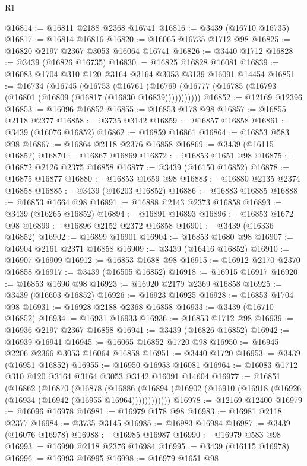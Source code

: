 \begin{lexlean}{R1}
\begin{coremodule}
@16814 := @16811 @2188 @2368 @16741
@16816 := @3439 (@16710 @16735)
@16817 := @16814 @16816
@16820 := @16065 @16735 @1712 @98
@16825 := @16820 @2197 @2367 @3053 @16064 @16741
@16826 := @3440 @1712
@16828 := @3439 (@16826 @16735)
@16830 := @16825 @16828 @16081
@16839 := @16083 @1704 @310 @120 @3164 @3164 @3053 @3139 @16091 @14454
@16851 := @16734
    (@16745
      (@16753
        (@16761 (@16769 (@16777 (@16785 (@16793 (@16801 (@16809 (@16817 (@16830 @16839)))))))))))
@16852 := @12169 @12396
@16853 := @16096 @16852
@16855 := @16853 @178 @98
@16857 := @16855 @2118 @2377
@16858 := @3735 @3142
@16859 := @16857 @16858
@16861 := @3439 (@16076 @16852)
@16862 := @16859 @16861
@16864 := @16853 @583 @98
@16867 := @16864 @2118 @2376 @16858
@16869 := @3439 (@16115 @16852)
@16870 := @16867 @16869
@16872 := @16853 @1651 @98
@16875 := @16872 @2126 @2375 @16858
@16877 := @3439 (@16150 @16852)
@16878 := @16875 @16877
@16880 := @16853 @1659 @98
@16883 := @16880 @2135 @2374 @16858
@16885 := @3439 (@16203 @16852)
@16886 := @16883 @16885
@16888 := @16853 @1664 @98
@16891 := @16888 @2143 @2373 @16858
@16893 := @3439 (@16265 @16852)
@16894 := @16891 @16893
@16896 := @16853 @1672 @98
@16899 := @16896 @2152 @2372 @16858
@16901 := @3439 (@16336 @16852)
@16902 := @16899 @16901
@16904 := @16853 @1680 @98
@16907 := @16904 @2161 @2371 @16858
@16909 := @3439 (@16416 @16852)
@16910 := @16907 @16909
@16912 := @16853 @1688 @98
@16915 := @16912 @2170 @2370 @16858
@16917 := @3439 (@16505 @16852)
@16918 := @16915 @16917
@16920 := @16853 @1696 @98
@16923 := @16920 @2179 @2369 @16858
@16925 := @3439 (@16603 @16852)
@16926 := @16923 @16925
@16928 := @16853 @1704 @98
@16931 := @16928 @2188 @2368 @16858
@16933 := @3439 (@16710 @16852)
@16934 := @16931 @16933
@16936 := @16853 @1712 @98
@16939 := @16936 @2197 @2367 @16858
@16941 := @3439 (@16826 @16852)
@16942 := @16939 @16941
@16945 := @16065 @16852 @1720 @98
@16950 := @16945 @2206 @2366 @3053 @16064 @16858
@16951 := @3440 @1720
@16953 := @3439 (@16951 @16852)
@16955 := @16950 @16953 @16081
@16964 := @16083 @1712 @310 @120 @3164 @3164 @3053 @3142 @16091 @14604
@16977 := @16851
    (@16862
      (@16870
        (@16878
          (@16886 (@16894 (@16902 (@16910 (@16918 (@16926 (@16934 (@16942 (@16955 @16964))))))))))))
@16978 := @12169 @12400
@16979 := @16096 @16978
@16981 := @16979 @178 @98
@16983 := @16981 @2118 @2377
@16984 := @3735 @3145
@16985 := @16983 @16984
@16987 := @3439 (@16076 @16978)
@16988 := @16985 @16987
@16990 := @16979 @583 @98
@16993 := @16990 @2118 @2376 @16984
@16995 := @3439 (@16115 @16978)
@16996 := @16993 @16995
@16998 := @16979 @1651 @98

\end{coremodule}
\end{lexlean}

